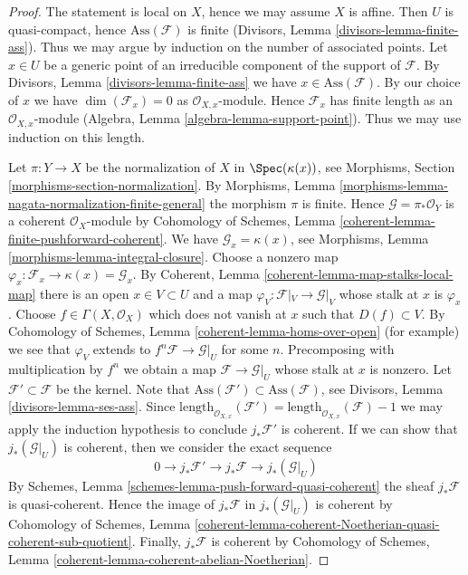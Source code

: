 \begin{proof}
The statement is local on $X$, hence we may assume $X$ is affine.
Then $U$ is quasi-compact, hence $\text{Ass}(\mathcal{F})$ is finite
(Divisors, Lemma \ref{divisors-lemma-finite-ass}). Thus we may argue by
induction on the number of associated points. Let $x \in U$ be a generic
point of an irreducible component of the support of $\mathcal{F}$.
By Divisors, Lemma \ref{divisors-lemma-finite-ass} we have
$x \in \text{Ass}(\mathcal{F})$. By our choice of $x$ we have
$\dim(\mathcal{F}_x) = 0$ as $\mathcal{O}_{X, x}$-module.
Hence $\mathcal{F}_x$ has finite length as an $\mathcal{O}_{X, x}$-module
(Algebra, Lemma \ref{algebra-lemma-support-point}).
Thus we may use induction on this length.

\medskip\noindent
Let $\pi : Y \to X$ be the normalization of $X$ in $\Spec(\kappa(x))$, see
Morphisms, Section \ref{morphisms-section-normalization}. By
Morphisms, Lemma \ref{morphisms-lemma-nagata-normalization-finite-general}
the morphism $\pi$ is finite. Hence $\mathcal{G} = \pi_*\mathcal{O}_Y$
is a coherent $\mathcal{O}_X$-module by
Cohomology of Schemes, Lemma \ref{coherent-lemma-finite-pushforward-coherent}.
We have $\mathcal{G}_x = \kappa(x)$, see
Morphisms, Lemma \ref{morphisms-lemma-integral-closure}.
Choose a nonzero map
$\varphi_x : \mathcal{F}_x \to \kappa(x) = \mathcal{G}_x$.
By Coherent, Lemma \ref{coherent-lemma-map-stalks-local-map}
there is an open $x \in V \subset U$ and a map
$\varphi_V : \mathcal{F}|_V \to \mathcal{G}|_V$ whose stalk
at $x$ is $\varphi_x$. Choose $f \in \Gamma(X, \mathcal{O}_X)$
which does not vanish at $x$ such that $D(f) \subset V$. By
Cohomology of Schemes, Lemma \ref{coherent-lemma-homs-over-open}
(for example) we see that $\varphi_V$ extends to
$f^n\mathcal{F} \to \mathcal{G}|_U$ for some $n$.
Precomposing with multiplication by $f^n$ we obtain a map
$\mathcal{F} \to \mathcal{G}|_U$ whose stalk at $x$ is nonzero.
Let $\mathcal{F}' \subset \mathcal{F}$ be the kernel.
Note that $\text{Ass}(\mathcal{F}') \subset \text{Ass}(\mathcal{F})$, see
Divisors, Lemma \ref{divisors-lemma-ses-ass}.
Since
$\text{length}_{\mathcal{O}_{X, x}}(\mathcal{F}') = 
\text{length}_{\mathcal{O}_{X, x}}(\mathcal{F}) - 1$
we may apply the
induction hypothesis to conclude $j_*\mathcal{F}'$ is coherent.
If we can show that $j_*(\mathcal{G}|_U)$ is coherent,
then we consider the exact sequence
$$
0 \to j_*\mathcal{F}' \to j_*\mathcal{F} \to j_*(\mathcal{G}|_U)
$$
By Schemes, Lemma \ref{schemes-lemma-push-forward-quasi-coherent}
the sheaf $j_*\mathcal{F}$ is quasi-coherent.
Hence the image of $j_*\mathcal{F}$ in $j_*(\mathcal{G}|_U)$
is coherent by Cohomology of Schemes, Lemma
\ref{coherent-lemma-coherent-Noetherian-quasi-coherent-sub-quotient}.
Finally, $j_*\mathcal{F}$ is coherent by
Cohomology of Schemes, Lemma \ref{coherent-lemma-coherent-abelian-Noetherian}.


\end{proof}
